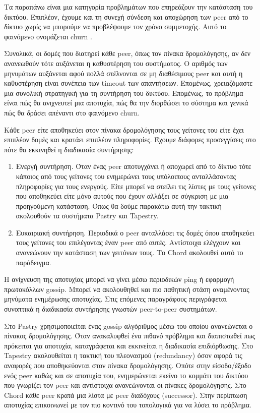Τα παραπάνω είναι μια κατηγορία προβλημάτων που επηρεάζουν την κατάσταση 
του δικτύου. Επιπλέον, έχουμε και τη συνεχή σύνδεση και αποχώρηση των 
peer από το δίκτυο χωρίς να μπορούμε να προβλέψουμε τον χρόνο 
συμμετοχής. Αυτό το φαινόμενο ονομάζεται churn \citep{Buford2009}. 

Συνολικά, οι δομές που διατηρεί κάθε peer, όπως τον πίνακα δρομολόγησης, 
αν δεν ανανεωθούν τότε αυξάνεται η καθυστέρηση του συστήματος. Ο αριθμός 
των μηνυμάτων αυξάνεται αφού πολλά στέλνονται σε μη διαθέσιμους peer και 
αυτή η καθυστέρηση είναι συνέπεια των timeout των απαντήσεων. Επομένως, 
χρειαζόμαστε μια συνολική στρατηγική για τη συντήρηση του δικτύου. 
Επομένως, το πρόβλημα είναι πώς θα ανιχνευτεί μια αποτυχία, πώς θα την 
διορθώσει το σύστημα και γενικά πώς θα δράσει απέναντι στο φαινόμενο 
churn.

Κάθε peer είτε αποθηκεύει στον πίνακα δρομολόγησης τους γείτονες του 
είτε έχει επιπλέον δομές και κρατάει επιπλέον πληροφορίες. Έχουμε 
διάφορες προσεγγίσεις στο πότε θα εκκινηθεί η διαδικασία συντήρησης:

\begin{enumerate}
\item Ενεργή συντήρηση. Όταν ένας peer αποτυγχάνει ή αποχωρεί από το 
δίκτυο τότε κάποιος από τους γείτονες του ενημερώνει τους υπόλοιπους 
ανταλλάσοντας πληροφορίες για τους ενεργούς. Είτε μπορεί να στείλει τις 
λίστες με τους γείτονες που αποθηκεύει είτε μόνο αυτούς που έχουν αλλάξει 
σε σύγκριση με μια προηγούμενη κατάσταση. Όπως θα δούμε παρακάτω αυτή την 
τακτική ακολουθούν τα συστήματα Pastry και Tapestry.
\item Ευκαιριακή συντήρηση. Περιοδικά ο peer ανταλλάσει τις δομές όπου 
αποθηκεύει τους γείτονες του επιλέγοντας έναν peer από αυτές. Αντίστοιχα 
ελέγχουν και ανανεώνουν την κατάσταση των γειτόνων τους. Το Chord 
ακολουθεί αυτό το παράδειγμα.
\end{enumerate}

Η ανίχνευση της αποτυχίας μπορεί να γίνει μέσω περιοδικών ping ή 
εφαρμογή πρωτοκόλλων gossip. Μπορεί να ακολουθηθεί και πιο παθητική 
στάση αναμένοντας μηνύματα ενημέρωσης αποτυχίας. Στις επόμενες 
παραγράφους περιγράφεται συνοπτικά η διαδικασία συντήρησης γνωστών 
peer-to-peer συστημάτων.

Στο Pastry \citep{Pastry} χρησιμοποιείται ένας gossip αλγόριθμος μέσω 
του οποίου ανανεώνεται ο πίνακας δρομολόγησης. Όταν ανακαλυφθεί ένα 
πιθανό πρόβλημα και διαπιστωθεί πως πρόκειται για αποτυχία, καταγράφεται 
και εκκινείται η διαδικασία επιδιόρθωσης. Στο Tapestry \citep{Tapestry} 
ακολουθείται η τακτική του πλεονασμού (redundancy) όσον αφορά τις αναφορές 
που αποθηκεύονται στον πίνακα δρομολόγησης. Οπότε στην είσοδο/έξοδο ενός peer 
καθώς και σε αποτυχία του, ενημερώνεται εκείνο το κομμάτι του δικτύου που 
γνωρίζει τον peer και αντίστοιχα ανανεώνονται οι πίνακες δρομολόγησης. 
Στο Chord \citep{Chord} κάθε peer κρατά μια λίστα με peer διαδόχους 
(successor). Στην περίπτωση αποτυχίας επικοινωνεί με τον πιο κοντινό του 
τοπολογικά για να λύσει το πρόβλημα. 

